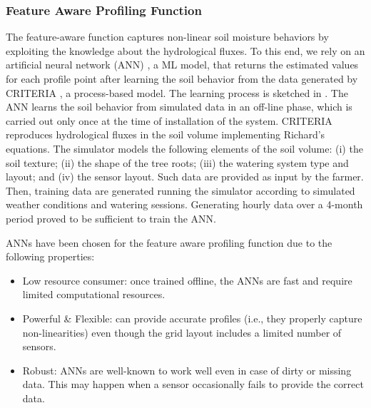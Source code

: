 \subsubsection{Feature Aware Profiling Function}
The feature-aware function captures non-linear soil moisture behaviors by exploiting the knowledge about the hydrological fluxes. To this end, we rely on an artificial neural network (ANN) \cite{bishop1994neural}, a ML model, that returns the estimated values for each profile point after learning the soil behavior from the data generated by CRITERIA \cite{Bittelli2011253}, a process-based model.
The learning process is sketched in .
The ANN learns the soil behavior from simulated data in an off-line phase, which is carried out only once at the time of installation of the system.
CRITERIA reproduces hydrological fluxes in the soil volume implementing Richard's equations.
The simulator models the following elements of the soil volume: (i) the soil texture; (ii) the shape of the tree roots; (iii) the watering system type and layout; and (iv) the sensor layout.
Such data are provided as input by the farmer.
Then, training data are generated running the simulator according to simulated weather conditions and watering sessions.
Generating hourly data over a 4-month period proved to be sufficient to train the ANN.

ANNs have been chosen for the feature aware profiling function due to the following properties:
\begin{itemize}
    \item Low resource consumer: once trained offline, the ANNs are fast and require limited computational resources. 
    \item Powerful \& Flexible: can provide accurate profiles (i.e., they properly capture non-linearities) even though the grid layout includes a limited number of sensors. 
    \item Robust: ANNs are well-known to work well even in case of dirty or missing data. This may happen when a sensor occasionally fails to provide the correct data. 
\end{itemize}

